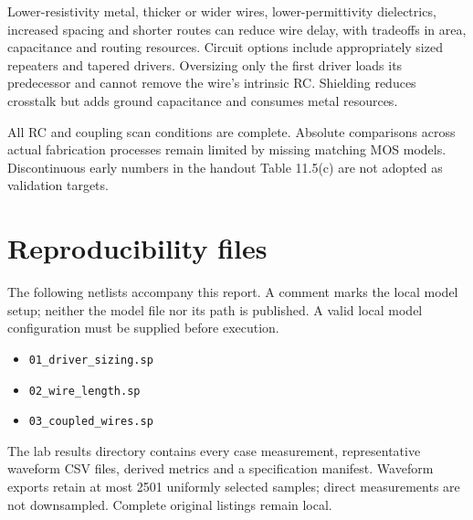 Lower-resistivity metal, thicker or wider wires, lower-permittivity dielectrics, increased spacing and shorter routes can reduce wire delay, with tradeoffs in area, capacitance and routing resources. Circuit options include appropriately sized repeaters and tapered drivers. Oversizing only the first driver loads its predecessor and cannot remove the wire's intrinsic RC. Shielding reduces crosstalk but adds ground capacitance and consumes metal resources.

All RC and coupling scan conditions are complete. Absolute comparisons across actual fabrication processes remain limited by missing matching MOS models. Discontinuous early numbers in the handout Table 11.5(c) are not adopted as validation targets.

\section{Reproducibility files}
The following netlists accompany this report. A comment marks the local model setup; neither the model file nor its path is published. A valid local model configuration must be supplied before execution.
\begin{itemize}
\item \texttt{01\_driver\_sizing.sp}
\item \texttt{02\_wire\_length.sp}
\item \texttt{03\_coupled\_wires.sp}
\end{itemize}
The lab results directory contains every case measurement, representative waveform CSV files, derived metrics and a specification manifest. Waveform exports retain at most 2501 uniformly selected samples; direct measurements are not downsampled. Complete original listings remain local.

